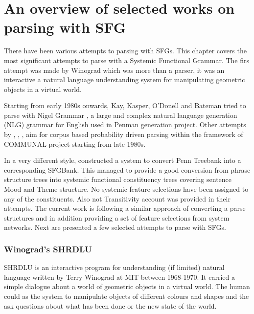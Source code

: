 \chapter{An overview of selected works on parsing with SFG}
\label{ch:sota}

\label{sec:sota}
There have been various attempts to parsing with SFGs. This chapter covers the most significant attempts to parse with a Systemic Functional Grammar. The firs attempt was made by Winograd \citep{Winograd1972} which was more than a parser, it was an interactive a natural language understanding system for manipulating geometric objects in a virtual world.

Starting from early 1980s onwards, Kay, Kasper, O'Donell and Bateman tried to parse with Nigel Grammar \citep{Matthiessen1985}, a large and complex natural language generation (NLG) grammar for English used in Penman generation project. Other attempts by \citet{ODonoghue1991a}, \citet{Weerasinghe1994}, \citet{Souter1996}, \citet{Day2007} aim for corpus based probability driven parsing within the framework of COMMUNAL project starting from late 1980s.

In a very different style, \citet{Honnibal2004a,Honnibal2007} constructed a system to convert Penn Treebank into a corresponding SFGBank. This managed to provide a good conversion from phrase structure trees into systemic functional constituency trees covering sentence Mood and Theme structure. No systemic feature selections have been assigned to any of the constituents. Also not Transitivity account was provided in their attempts. The current work is following a similar approach of converting a parse structures and in addition providing a set of feature selections from system networks. Next are presented a few selected attempts to parse with SFGs. 

\subsection{Winograd's SHRDLU}
SHRDLU is an interactive program for understanding (if limited) natural language written by Terry Winograd at MIT between 1968-1970. It carried a simple dialogue about a world of geometric objects in a virtual world. The human could as the system to manipulate objects of different colours and shapes and the ask questions about what has been done or the new state of the world. 

